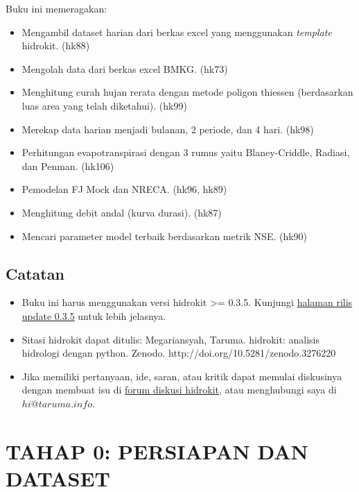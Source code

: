 \documentclass[11pt]{article}
\providecommand{\tightlist}{%
      \setlength{\itemsep}{0pt}\setlength{\parskip}{0pt}}
\begin{document}
Buku ini memeragakan:

\begin{itemize}
\tightlist
\item
  Mengambil dataset harian dari berkas excel yang menggunakan
  \emph{template} hidrokit. (hk88)
\item
  Mengolah data dari berkas excel BMKG. (hk73)
\item
  Menghitung curah hujan rerata dengan metode poligon thiessen
  (berdasarkan luas area yang telah diketahui). (hk99)
\item
  Merekap data harian menjadi bulanan, 2 periode, dan 4 hari. (hk98)
\item
  Perhitungan evapotranspirasi dengan 3 rumus yaitu Blaney-Criddle,
  Radiasi, dan Penman. (hk106)
\item
  Pemodelan FJ Mock dan NRECA. (hk96, hk89)
\item
  Menghitung debit andal (kurva durasi). (hk87)
\item
  Mencari parameter model terbaik berdasarkan metrik NSE. (hk90)
\end{itemize}

\hypertarget{catatan}{%
\subsection{Catatan}\label{catatan}}

\begin{itemize}
\tightlist
\item
  Buku ini harus menggunakan versi hidrokit \textgreater= 0.3.5.
  Kunjungi
  \href{https://github.com/hidrokit/hidrokit/releases/tag/0.3.5}{halaman
  rilis update 0.3.5} untuk lebih jelasnya.
\item
  Sitasi hidrokit dapat ditulis: Megariansyah, Taruma. hidrokit:
  analisis hidrologi dengan python. Zenodo.
  http://doi.org/10.5281/zenodo.3276220
\item
  Jika memiliki pertanyaan, ide, saran, atau kritik dapat memulai
  diskusinya dengan membuat isu di
  \href{https://github.com/hidrokit/hidrokit/discussions}{forum diskusi
  hidrokit}, atau menghubungi saya di \(hi@taruma.info\).
\end{itemize}

    \hypertarget{tahap-0-persiapan-dan-dataset}{%
\section{TAHAP 0: PERSIAPAN DAN
DATASET}\label{tahap-0-persiapan-dan-dataset}}
\end{document}
